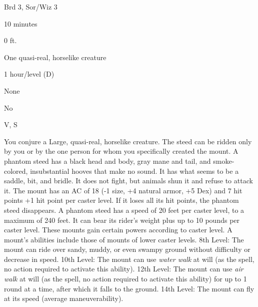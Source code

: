 
\begin{description*}
\item[Level:] Brd 3, Sor/Wiz 3
\item[Casting Time:] 10 minutes
\item[Range:] 0 ft.
\item[Effect:] One quasi-real, horselike creature
\item[Duration:] 1 hour/level (D)
\item[Saving Throw:] None
\item[Spell Resistance:] No
\item[Components:] V, S
\end{description*}

You conjure a Large, quasi-real, horselike creature. The steed can be ridden only
by you or by the one person for whom you specifically created the mount. A phantom
steed has a black head and body, gray mane and tail, and smoke-colored, insubstantial
hooves that make no sound. It has what seems to be a saddle, bit, and bridle. It
does not fight, but animals shun it and refuse to attack it.
The mount has an AC of 18 (-1 size, +4 natural armor, +5 Dex) and 7 hit points
+1 hit point per caster level. If it loses all its hit points, the phantom steed
disappears. A phantom steed has a speed of 20 feet per caster level, to a maximum
of 240 feet. It can bear its rider's weight plus up to 10 pounds per caster level.
These mounts gain certain powers according to caster level. A mount's abilities
include those of mounts of lower caster levels.
8th Level: The mount can ride over sandy, muddy, or even swampy ground
without difficulty or decrease in speed.
10th Level: The mount can use \textit{water walk} at will (as the spell,
no action required to activate this ability).
12th Level: The mount can use \textit{air walk} at will (as the spell,
no action required to activate this ability) for up to 1 round at a time, after
which it falls to the ground.
14th Level: The mount can fly at its speed (average maneuverability).